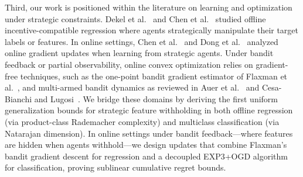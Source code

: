Third, our work is positioned within the literature on learning and optimization under strategic constraints. Dekel et al.~\cite{dekel2010incentive} and Chen et al.~\cite{chen2018incentive} studied offline incentive-compatible regression where agents strategically manipulate their target labels or features. In online settings, Chen et al.~\cite{chen2020learning} and Dong et al.~\cite{dong2018strategic} analyzed online gradient updates when learning from strategic agents. Under bandit feedback or partial observability, online convex optimization relies on gradient-free techniques, such as the one-point bandit gradient estimator of Flaxman et al.~\cite{flaxman2005online}, and multi-armed bandit dynamics as reviewed in Auer et al.~\cite{auer2002nonadversarial} and Cesa-Bianchi and Lugosi~\cite{cesabianchi2006prediction}. We bridge these domains by deriving the first uniform generalization bounds for strategic feature withholding in both offline regression (via product-class Rademacher complexity) and multiclass classification (via Natarajan dimension). In online settings under bandit feedback—where features are hidden when agents withhold—we design updates that combine Flaxman's bandit gradient descent for regression and a decoupled EXP3+OGD algorithm for classification, proving sublinear cumulative regret bounds.
